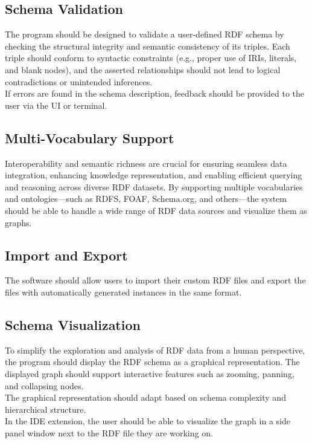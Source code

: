 \subsection{Schema Validation\label{sec:reqsuba}}
The program should be designed to validate a user-defined RDF schema by checking the structural integrity and semantic consistency of its triples. 
Each triple should conform to syntactic constraints (e.g., proper use of IRIs, literals, and blank nodes), and the asserted relationships should not lead to logical contradictions or unintended inferences.
\\
If errors are found in the schema description, feedback should be provided to the user via the UI or terminal.

\subsection{Multi-Vocabulary Support\label{sec:reqsuba}}
Interoperability and semantic richness are crucial for ensuring seamless data integration, enhancing knowledge representation, and enabling efficient querying and reasoning across diverse RDF datasets.
By supporting multiple vocabularies and ontologies—such as RDFS, FOAF, Schema.org, and others—the system should be able to handle a wide range of RDF data sources and visualize them as graphs.

\subsection{Import and Export\label{sec:reqsuba}}
The software should allow users to import their custom RDF files and export the files with automatically generated instances in the same format.

\subsection{Schema Visualization\label{sec:reqsuba}}
To simplify the exploration and analysis of RDF data from a human perspective, the program should display the RDF schema as a graphical representation.
The displayed graph should support interactive features such as zooming, panning, and collapsing nodes.
\\
The graphical representation should adapt based on schema complexity and hierarchical structure.
\\
In the IDE extension, the user should be able to visualize the graph in a side panel window next to the RDF file they are working on.

